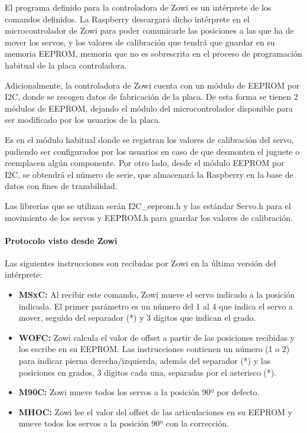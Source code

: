 El programa definido para la controladora de Zowi es un intérprete de los comandos definidos. La Raspberry descargará dicho intérprete en el microcontrolador de Zowi para poder comunicarle las posiciones a las que ha de mover los servos, y los valores de calibración que tendrá que guardar en su memoria EEPROM, memoria que no es sobrescrita en el proceso de programación habitual de la placa controladora.

Adicionalmente, la controladora de Zowi cuenta con un módulo de EEPROM por I2C, donde se recogen datos de fabricación de la placa. De esta forma se tienen 2 módulos de EEPROM, dejando el módulo del microcontrolador disponible para ser modificado por los usuarios de la placa.

Es en el módulo habitual donde se registran los valores de calibración del servo, pudiendo ser configurados por los usuarios en caso de que desmonten el juguete o reemplacen algún componente. Por otro lado, desde el módulo EEPROM por I2C, se obtendrá el número de serie, que almacenará la Raspberry en la base de datos con fines de trazabilidad.

Las librerías que se utilizan serán I2C\_eeprom.h y las estándar Servo.h para el movimiento de los servos y EEPROM.h para guardar los valores de calibración.

\paragraph{Protocolo visto desde Zowi}

Las siguientes instrucciones son recibidas por Zowi en la última versión del intérprete:

\begin{itemize}
  \item \textbf{MSxC:} Al recibir este comando, Zowi mueve el servo indicado a la posición indicada. El primer parámetro es un número del 1 al 4 que indica el servo a mover, seguido del separador (*) y 3 dígitos que indican el grado.
  \item \textbf{WOFC:} Zowi calcula el valor de offset a partir de las posiciones recibidas y los escribe en su EEPROM. Las instrucciones contienen un número (1 o 2) para indicar pierna derecha/izquierda, además del separador (*) y las posiciones en grados, 3 dígitos cada una, separadas por el asterisco (*).
  \item \textbf{M90C:} Zowi mueve todos los servos a la posición 90º por defecto.
  \item \textbf{MHOC:} Zowi lee el valor del offset de las articulaciones en su EEPROM y mueve todos los servos a la posición 90º con la corrección.
\end{itemize}

